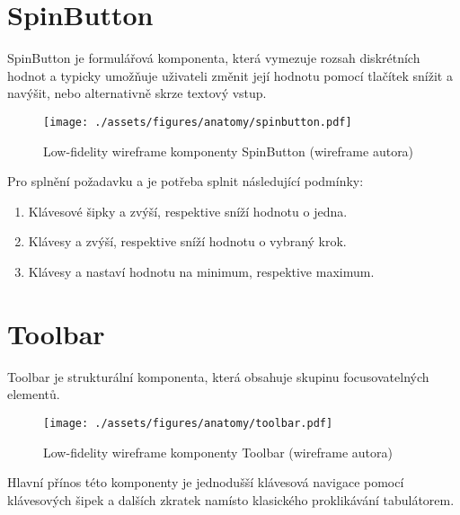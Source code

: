 \section{SpinButton}

SpinButton je formulářová komponenta, která vymezuje rozsah diskrétních hodnot a typicky umožňuje uživateli změnit její hodnotu pomocí tlačítek snížit a navýšit, nebo alternativně skrze textový vstup.

\begin{figure}[htp]
    \centering
    \texttt{[image: ./assets/figures/anatomy/spinbutton.pdf]}
    \captionsetup{justification=centering}
    \caption[Low-fidelity wireframe komponenty SpinButton]{Low-fidelity wireframe komponenty SpinButton (wireframe autora)}
\end{figure}

Pro splnění požadavku \hyperref[ofr11]{} a \hyperref[sfr12]{} je potřeba splnit následující podmínky:

\begin{enumerate}
    \item Klávesové šipky \keys{\arrowkeyup} a \keys{\arrowkeydown} zvýší, respektive sníží hodnotu o jedna.
    \item Klávesy  a  zvýší, respektive sníží hodnotu o vybraný krok.
    \item Klávesy  a  nastaví hodnotu na minimum, respektive maximum.
\end{enumerate}

\section{Toolbar}

Toolbar je strukturální komponenta, která obsahuje skupinu focusovatelných elementů.

\begin{figure}[htp]
    \centering
    \texttt{[image: ./assets/figures/anatomy/toolbar.pdf]}
    \captionsetup{justification=centering}
    \caption[Low-fidelity wireframe komponenty Toolbar]{Low-fidelity wireframe komponenty Toolbar (wireframe autora)}
\end{figure}

Hlavní přínos této komponenty je jednodušší klávesová navigace pomocí klávesových šipek a dalších zkratek namísto klasického proklikávání tabulátorem.

